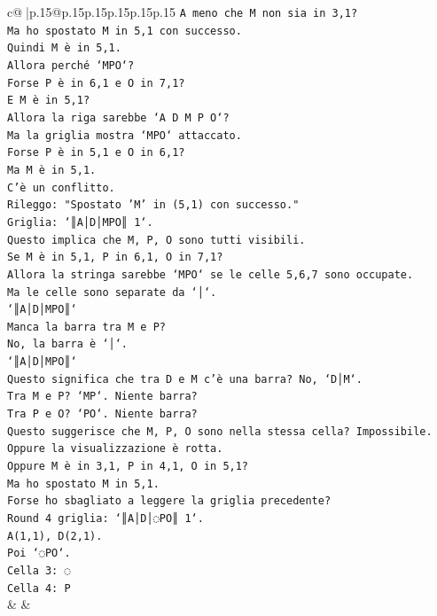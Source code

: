 \documentclass{article}
\begin{document}
{\begin{supertabular}{c@{$\;$}|p{.15\linewidth}@{}p{.15\linewidth}p{.15\linewidth}p{.15\linewidth}p{.15\linewidth}p{.15\linewidth}}
{{{\texttt{A meno che M non sia in 3,1?} \\
\texttt{Ma ho spostato M in 5,1 con successo.} \\
\texttt{Quindi M è in 5,1.} \\
\texttt{Allora perché `MPO`?} \\
\texttt{Forse P è in 6,1 e O in 7,1?} \\
\texttt{E M è in 5,1?} \\
\texttt{Allora la riga sarebbe `A D M P O`?} \\
\texttt{Ma la griglia mostra `MPO` attaccato.} \\
\texttt{Forse P è in 5,1 e O in 6,1?} \\
\texttt{Ma M è in 5,1.} \\
\texttt{C'è un conflitto.} \\
\texttt{Rileggo: "Spostato 'M' in (5,1) con successo."} \\
\texttt{Griglia: `║A│D│MPO║ 1`.} \\
\texttt{Questo implica che M, P, O sono tutti visibili.} \\
\texttt{Se M è in 5,1, P in 6,1, O in 7,1?} \\
\texttt{Allora la stringa sarebbe `MPO` se le celle 5,6,7 sono occupate.} \\
\texttt{Ma le celle sono separate da `│`.} \\
\texttt{`║A│D│MPO║`} \\
\texttt{Manca la barra tra M e P?} \\
\texttt{No, la barra è `│`.} \\
\texttt{`║A│D│MPO║`} \\
\texttt{Questo significa che tra D e M c'è una barra? No, `D│M`.} \\
\texttt{Tra M e P? `MP`. Niente barra?} \\
\texttt{Tra P e O? `PO`. Niente barra?} \\
\texttt{Questo suggerisce che M, P, O sono nella stessa cella? Impossibile.} \\
\texttt{Oppure la visualizzazione è rotta.} \\
\texttt{Oppure M è in 3,1, P in 4,1, O in 5,1?} \\
\texttt{Ma ho spostato M in 5,1.} \\
\texttt{Forse ho sbagliato a leggere la griglia precedente?} \\
\texttt{Round 4 griglia: `║A│D│◌PO║ 1`.} \\
\texttt{A(1,1), D(2,1).} \\
\texttt{Poi `◌PO`.} \\
\texttt{Cella 3: ◌} \\
\texttt{Cella 4: P} \\
            }
        }
    }
    & & \\ \\


\end{supertabular}}
\end{document}
